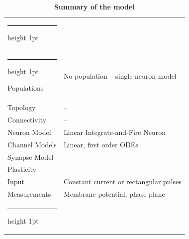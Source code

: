 \documentclass[10pt,a4paper,onecolumn]{article}
\makeatletter
\newcommand{\thickhline}{%
    \noalign {\ifnum 0=`}\fi \hrule height 1pt
    \futurelet \reserved@a \@xhline
}
\makeatother
\begin{document}
\begin{table}[!htbp]
    \centering
    \begin{tabular}{ll}
        \thickhline
        \multicolumn{2}{c}{Model Summary} \\\thickhline
        \rowcolor{Gray}
        Populations  & No population -- single neuron model \\\rowcolor{LightGray}
        Topology     & -- \\ \rowcolor{Gray}
        Connectivity & -- \\ \rowcolor{LightGray}
        Neuron Model & Linear Integrate-and-Fire Neuron \\\rowcolor{Gray}
        Channel Models & Linear, first order ODEs  \\ \rowcolor{LightGray}
        Synapse Model & -- \\ \rowcolor{Gray}
        Plasticity & -- \\ \rowcolor{LightGray}
        Input & Constant current or rectangular pulses \\\rowcolor{Gray}
        Measurements & Membrane potential, phase plane \\
        \thickhline
    \end{tabular}
    \caption{{\bfseries \sffamily Summary of the model}} 
    \label{table:1}
\end{table}
\end{document}
